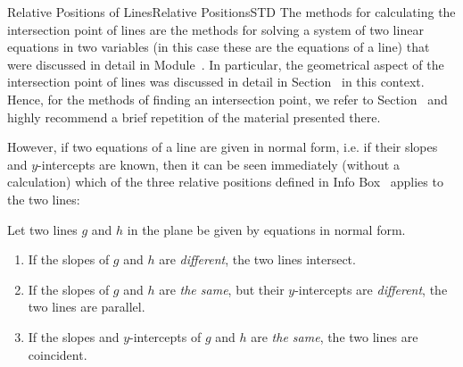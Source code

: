 \begin{MXContent}{Relative Positions of Lines}{Relative Positions}{STD}
The methods for calculating the intersection point of lines are the methods for solving a system of two linear equations in two variables 
(in this case these are the equations of a line) that were discussed in detail in Module~. In particular, the 
geometrical aspect of the intersection point of lines was discussed in detail in Section~ in this context. Hence, 
for the methods of finding an intersection point, we refer to Section~ and highly recommend a brief repetition of the 
material presented there.

However, if two equations of a line are given in normal form, i.e. if their slopes and $y$-intercepts are known, then 
it can be seen immediately (without a calculation) which of the three relative positions defined in Info Box~
applies to the two lines:

\begin{MInfo}
Let two lines $g$ and $h$ in the plane be given by equations in normal form.
\begin{enumerate}
 \item If the slopes of $g$ and $h$ are \textit{different}, the two lines intersect.
 \item If the slopes of $g$ and $h$ are \textit{the same}, but their $y$-intercepts are \textit{different}, the two lines are parallel.
 \item If the slopes and $y$-intercepts of $g$ and $h$ are \textit{the same}, the two lines are coincident.
\end{enumerate}

\end{MInfo}


\end{MXContent}
